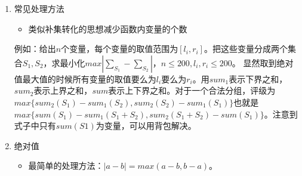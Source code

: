 \documentclass[11pt]{article}
\begin{document}
\begin{enumerate}
\item 常见处理方法
\label{sec:org3c874c9}

\begin{itemize}
\item 类似补集转化的思想减少函数内变量的个数
\end{itemize}

例如：给出\(n\)个变量，每个变量的取值范围为\([l_i,r_i]\)。把这些变量分成两个集合\(S_1,S_2\)，求最小化\(max|\sum_{S_1}-\sum_{S_2}|\)，\(n \leq 200, l_i, r_i \leq 200\)。 显然取到绝对值最大值的时候所有变量的取值要么为\(l_i\)要么为\(r_i\)。用\(sum_1\)表示下界之和，\(sum_2\)表示上界之和，\(sum\)表示上下界之和。对于一个合法分组，评级为\(max\{sum_2(S_1)-sum_1(S_2),sum_2(S_2)-sum_1(S_1)\}\)也就是\(max\{sum(S_1)-sum_1(S_1+S_2),sum_2(S_1+S_2)-sum(S_1)\}\)。注意到式子中只有\(sum(S1)\)为变量，可以用背包解决。

\item 绝对值
\label{sec:org641b2d7}

\begin{itemize}
\item 最简单的处理方法：\(|a-b| = max(a - b, b - a)\)。
\end{itemize}
\end{enumerate}
\end{document}
